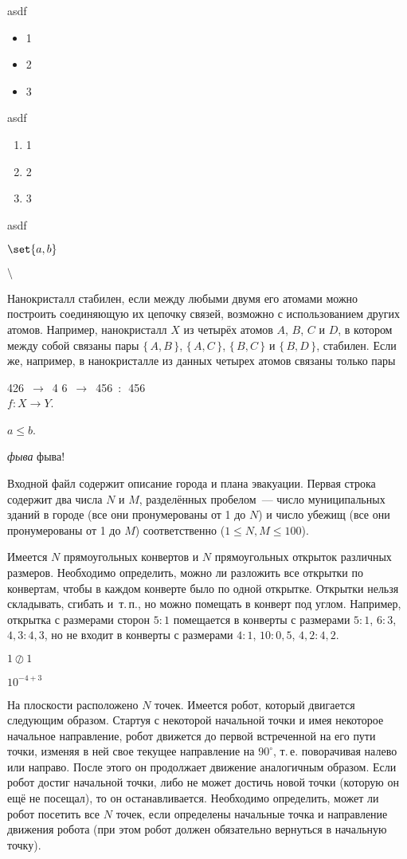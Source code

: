 \newcommand{\xxx}{\xxx!}

asdf
\begin{itemize}
    \item 1\\
    \item 2
    \item 3
\end{itemize}
asdf
\begin{enumerate}
    \item 1\\
    \item 2
    \item 3
\end{enumerate}
asdf


$\set{a, b}$

$\setminus$

Нанокристалл стабилен, если между любыми двумя его атомами можно построить 
соединяющую их цепочку связей, возможно с использованием других атомов. 
Например, нанокристалл $X$ из четырёх атомов $A$, $B$, $C$ и $D$, в котором между собой 
связаны пары $\{\,A, B\,\}$, $\{\,A, C\,\}$, $\{\,B, C\,\}$ и $\{\,B, D\,\}$, стабилен.
Если же, например, в нанокристалле из данных четырех атомов связаны только пары

426~$\to$~4 6~$\to$~456~$:$~456\\

$f\colon X \to Y$.

$a \le b$.

\textit{фыва} фыва!

Входной файл содержит описание города и плана эвакуации.
Первая строка содержит два числа $N$ и $M$, разделённых пробелом~--- число 
муниципальных зданий в городе (все они пронумерованы от 1 до $N$)
и число убежищ (все они пронумерованы от 1 до $M$) соответственно ($1 \le N, M \le 100$).

Имеется $N$ прямоугольных конвертов и $N$ прямоугольных открыток различных 
размеров. Необходимо определить, можно ли разложить все открытки по конвертам,
чтобы в каждом конверте было по одной открытке. Открытки нельзя 
складывать, сгибать \mbox{и~т.\,п.,} но можно помещать в конверт под углом. Например, 
открытка с размерами сторон $5:1$ помещается в конверты с размерами $5:1$, $6{:}3$, 
$4{,}3:4{,}3$, но не входит в конверты с размерами $4:1$, $10:0{,}5$, $4{,}2:4{,}2$.

$1 \oslash 1$

$10^{ - 4 + 3}$

На плоскости расположено $N$ точек. Имеется робот, который двигается следующим 
образом. Стартуя с некоторой начальной точки и имея некоторое начальное 
направление, робот движется до первой встреченной на его пути точки, изменяя в 
ней свое текущее направление на $90^\circ$, \mbox{т.\,е.} поворачивая налево или 
направо. После этого он продолжает движение аналогичным образом. Если робот 
достиг начальной точки, либо не может достичь новой точки (которую он ещё не 
посещал), то он останавливается.
Необходимо определить, может ли робот посетить все $N$ точек, если определены 
начальные точка и направление движения робота (при этом робот должен 
обязательно вернуться в начальную точку).

